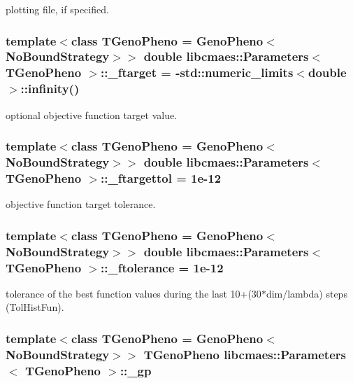 plotting file, if specified. \hypertarget{classlibcmaes_1_1Parameters_a837dbcfba351a043441076a11666f92c}{
\subsubsection[{\-\_\-ftarget}]{\setlength{\rightskip}{0pt plus 5cm}template$<$class T\-Geno\-Pheno = Geno\-Pheno$<$\-No\-Bound\-Strategy$>$$>$ double {\bf libcmaes\-::\-Parameters}$<$ T\-Geno\-Pheno $>$\-::\-\_\-ftarget = -\/std\-::numeric\-\_\-limits$<$double$>$\-::infinity()}}\label{classlibcmaes_1_1Parameters_a837dbcfba351a043441076a11666f92c}
optional objective function target value. \hypertarget{classlibcmaes_1_1Parameters_af9dde10c81d743c7f684d486f989d1a4}{
\subsubsection[{\-\_\-ftargettol}]{\setlength{\rightskip}{0pt plus 5cm}template$<$class T\-Geno\-Pheno = Geno\-Pheno$<$\-No\-Bound\-Strategy$>$$>$ double {\bf libcmaes\-::\-Parameters}$<$ T\-Geno\-Pheno $>$\-::\-\_\-ftargettol = 1e-\/12}}\label{classlibcmaes_1_1Parameters_af9dde10c81d743c7f684d486f989d1a4}
objective function target tolerance. \hypertarget{classlibcmaes_1_1Parameters_ab6c11cc112b5709e9039967e881c808e}{
\subsubsection[{\-\_\-ftolerance}]{\setlength{\rightskip}{0pt plus 5cm}template$<$class T\-Geno\-Pheno = Geno\-Pheno$<$\-No\-Bound\-Strategy$>$$>$ double {\bf libcmaes\-::\-Parameters}$<$ T\-Geno\-Pheno $>$\-::\-\_\-ftolerance = 1e-\/12}}\label{classlibcmaes_1_1Parameters_ab6c11cc112b5709e9039967e881c808e}
tolerance of the best function values during the last 10+(30$\ast$dim/lambda) steps (Tol\-Hist\-Fun). \hypertarget{classlibcmaes_1_1Parameters_ab8e153b4785de9358599caa840b94ef2}{
\subsubsection[{\-\_\-gp}]{\setlength{\rightskip}{0pt plus 5cm}template$<$class T\-Geno\-Pheno = Geno\-Pheno$<$\-No\-Bound\-Strategy$>$$>$ T\-Geno\-Pheno {\bf libcmaes\-::\-Parameters}$<$ T\-Geno\-Pheno $>$\-::\-\_\-gp}}\label{classlibcmaes_1_1Parameters_ab8e153b4785de9358599caa840b94ef2}
